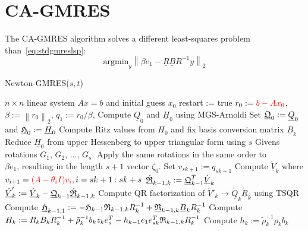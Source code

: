 \documentclass{scrartcl}
\numberwithin{equation}{section}
\newcommand{\norm}[1]{\left\lVert#1\right\rVert}
\begin{document}
\section{CA-GMRES} \label{sec:ca-gmres}

The CA-GMRES algorithm solves a different least-squares problem than~\eqref{eq:stdgmreslsp}:
\begin{equation}
	\text{argmin}_y \norm{\beta e_1 - \underline{R} \underline{B} R^{-1} y}_2
\end{equation}

\begin{algorithm}[H]
\caption{Newton-GMRES($s,t$)}
\label{alg:ca-gmres}
\begin{algorithmic}[1]
    \REQUIRE $n \times n$ linear system $Ax = b$ and initial guess $x_0$
	\STATE restart := true
    \STATE $r_0:=\textcolor{red}{b-Ax_0}$, $\beta := \norm{r_0}_2$, $q_1 := r_0/\beta$, 
        	\STATE Compute $\underline{Q}_0$ and $\underline{H}_0$ using MGS-Arnoldi
        	\STATE Set $\underline{\frak{Q}}_0 := \underline{Q}_0$ and $\underline{\frak{H}}_0 := \underline{H}_0$
        	\STATE Compute Ritz values from $H_0$ and fix basis conversion matrix $\underline{B}_k$
			\STATE Reduce $\underline{H}_0$ from upper Hessenberg to upper triangular form using $s$ Givens \\
\hspace{\algorithmicindent} rotations $G_1$, $G_2$, $ \ldots$, $G_s$. Apply the same rotations in the same order to \\
\hspace{\algorithmicindent} $\beta e_1$, resulting in the length $s + 1$ vector $\zeta_0$.
		\ELSE
			\STATE Set $v_{sk + 1} := q_{sk + 1}$
			\STATE Compute $\underline{\acute{V}}_k$ where $v_{i + 1} = \textcolor{red}{(A - \theta_i I) v_i}, i = sk + 1:sk + s$
			\STATE $\underline{\acute{\frak{R}}}_{k-1,k} := \underline{\frak{Q}}^T_{k-1} \underline{\acute{V}}_k$
			\STATE $\underline{\acute{V}}'_k := \underline{\acute{V}}_k - \underline{\frak{Q}}_{k-1}\underline{\acute{\frak{R}}}_{k-1,k}$
			\STATE Compute QR factorization of $\underline{\acute{V}}'_k \rightarrow \underline{\acute{Q}}_k \underline{\acute{R}}_k$ using TSQR
			\STATE Compute $\underline{\frak{H}}_{k-1,1}:= - \frak{H}_{k-1} \frak{R}_{k-1,k} R^{-1}_k + \underline{\frak{R}}_{k-1,k} \underline{B}_k R^{-1}_k$
			\STATE Compute $H_k := R_k B_k R^{-1}_k + \tilde{\rho}^{-1}_k b_k z_k e^T_s - h_{k-1} e_1 e^T_{sk} \frak{R}_{k-1,k} R^{-1}_k$
			\STATE Compute $h_k := \tilde{\rho}^{-1}_k \rho_k b_k$

\end{algorithmic}
\end{algorithm}
\end{document}
